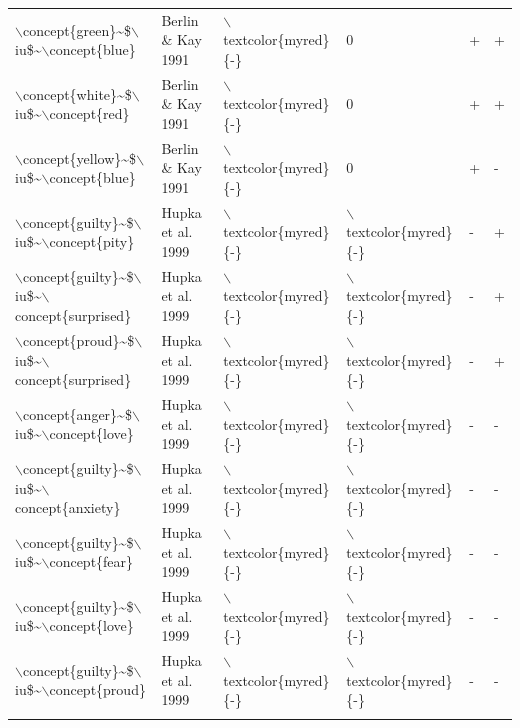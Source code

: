 \begin{longtable}{llllll}
  $\backslash$concept\{green\}\~{}\$$\backslash$iu\$\~{}$\backslash$concept\{blue\} & Berlin \& Kay 1991 & $\backslash$textcolor\{myred\}\{-\} & 0 & + & + \\ 
  $\backslash$concept\{white\}\~{}\$$\backslash$iu\$\~{}$\backslash$concept\{red\} & Berlin \& Kay 1991 & $\backslash$textcolor\{myred\}\{-\} & 0 & + & + \\ 
  $\backslash$concept\{yellow\}\~{}\$$\backslash$iu\$\~{}$\backslash$concept\{blue\} & Berlin \& Kay 1991 & $\backslash$textcolor\{myred\}\{-\} & 0 & + & - \\ 
  $\backslash$concept\{guilty\}\~{}\$$\backslash$iu\$\~{}$\backslash$concept\{pity\} & Hupka et al. 1999 & $\backslash$textcolor\{myred\}\{-\} & $\backslash$textcolor\{myred\}\{-\} & - & + \\ 
  $\backslash$concept\{guilty\}\~{}\$$\backslash$iu\$\~{}$\backslash$concept\{surprised\} & Hupka et al. 1999 & $\backslash$textcolor\{myred\}\{-\} & $\backslash$textcolor\{myred\}\{-\} & - & + \\ 
  $\backslash$concept\{proud\}\~{}\$$\backslash$iu\$\~{}$\backslash$concept\{surprised\} & Hupka et al. 1999 & $\backslash$textcolor\{myred\}\{-\} & $\backslash$textcolor\{myred\}\{-\} & - & + \\ 
  $\backslash$concept\{anger\}\~{}\$$\backslash$iu\$\~{}$\backslash$concept\{love\} & Hupka et al. 1999 & $\backslash$textcolor\{myred\}\{-\} & $\backslash$textcolor\{myred\}\{-\} & - & - \\ 
  $\backslash$concept\{guilty\}\~{}\$$\backslash$iu\$\~{}$\backslash$concept\{anxiety\} & Hupka et al. 1999 & $\backslash$textcolor\{myred\}\{-\} & $\backslash$textcolor\{myred\}\{-\} & - & - \\ 
  $\backslash$concept\{guilty\}\~{}\$$\backslash$iu\$\~{}$\backslash$concept\{fear\} & Hupka et al. 1999 & $\backslash$textcolor\{myred\}\{-\} & $\backslash$textcolor\{myred\}\{-\} & - & - \\ 
  $\backslash$concept\{guilty\}\~{}\$$\backslash$iu\$\~{}$\backslash$concept\{love\} & Hupka et al. 1999 & $\backslash$textcolor\{myred\}\{-\} & $\backslash$textcolor\{myred\}\{-\} & - & - \\ 
  $\backslash$concept\{guilty\}\~{}\$$\backslash$iu\$\~{}$\backslash$concept\{proud\} & Hupka et al. 1999 & $\backslash$textcolor\{myred\}\{-\} & $\backslash$textcolor\{myred\}\{-\} & - & - \\ 
   \hline
\hline
\label{tab:ipalong_cti}
\end{longtable}
